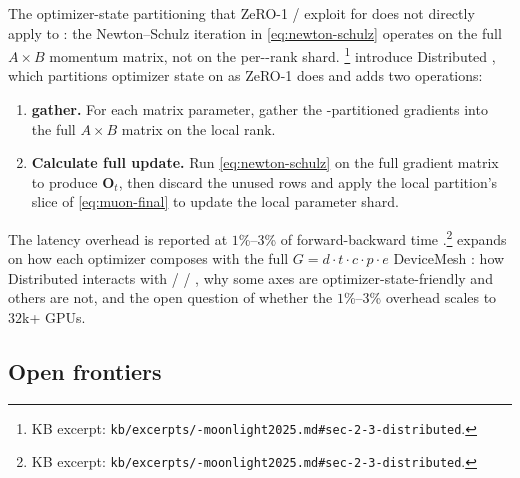 The optimizer-state partitioning that ZeRO-1 /  exploit for
 \citep[\S 2.2.4]{torchtitan2024} does not directly apply to
: the Newton--Schulz iteration in \cref{eq:newton-schulz}
operates on the full $A \times B$ momentum matrix, not on the
per--rank shard. \citet[\S
2.3]{muon-moonlight2025}\footnote{KB excerpt:
\texttt{kb/excerpts/-moonlight2025.md\#sec-2-3-distributed}.}
introduce Distributed , which partitions optimizer state on  as
ZeRO-1 does and adds two operations:
\begin{enumerate}
\item \textbf{ gather.} For each matrix parameter, gather the
-partitioned gradients into the full $A \times B$ matrix on the
local rank.
\item \textbf{Calculate full update.} Run \cref{eq:newton-schulz} on
the full gradient matrix to produce $\mathbf{O}_t$, then discard the
unused rows and apply the local partition's slice of \cref{eq:muon-final}
to update the local parameter shard.
\end{enumerate}
The latency overhead is reported at $1$\%--$3$\% of forward-backward
time \citep[\S 2.3]{muon-moonlight2025}.\footnote{KB excerpt:
\texttt{kb/excerpts/-moonlight2025.md\#sec-2-3-distributed}.}
 expands on how each optimizer
composes with the full $G = d \cdot t \cdot c \cdot p \cdot e$
DeviceMesh \citep[\S 4]{torchtitan2024}: how Distributed 
interacts with  /  / , why some axes are
optimizer-state-friendly and others are not, and the open question of
whether the $1$\%--$3$\% overhead scales to $32$k+ GPUs.

\subsection{Open frontiers}
\label{sec:opt-open}

